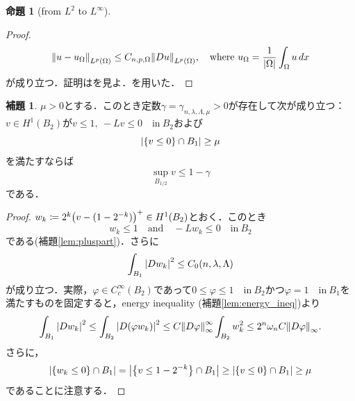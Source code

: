 \documentclass[a4paper]{ltjsarticle}
\newcommand{\Om}{\Omega}
\newcommand{\inn}{\quad\text{in}\ }
\newcommand{\1}{\mathbbm{1}}
\numberwithin{equation}{section}
\theoremstyle{definition}
\newtheorem{prop}[thm]{命題}
\newtheorem{lem}[thm]{補題}
\begin{document}
\begin{prop}[from $L^2$ to $L^\infty$]
\begin{proof}
{\begin{equation}
        \norm{u-u_{\Om}}_{L^p(\Om)}\leq C_{n,p,\Om}\norm{Du}_{L^p(\Om)},\quad \text{where }u_{\Om}=\frac{1}{\abs{\Om}}\int_{\Om}u\,dx 
    \end{equation}
    が成り立つ．証明は\cite[Section 5.8.1]{eva}を見よ．}を用いた．
\end{proof}
\begin{lem}\label{lem:DG_N_oscillation}
    $\mu>0$とする．このとき定数$\gamma=\gamma_{n,\lambda,\Lambda,\mu}>0$が存在して次が成り立つ：$v\in H^1(B_2)$が$v\leq 1,\ -Lv\leq0\inn B_2$および
    \begin{equation}
        \abs{\qty{v\leq0}\cap B_1}\geq \mu
    \end{equation}
    を満たすならば
    \begin{equation}
        \sup_{B_{1/2}}v\leq 1-\gamma 
    \end{equation}
    である．
\end{lem}
\begin{proof}
    $w_k\coloneqq 2^k\qty(v-(1-2^{-k}))^+\in H^{1}(B_2)$とおく．このとき
    \begin{equation}
        w_k\leq 1\quad \text{and}\quad -Lw_k\leq0\inn B_2 
    \end{equation}
    である(補題\ref{lem:pluspart})．さらに
    \begin{equation}
        \int_{B_1}\abs{Dw_k}^2\leq C_0(n,\lambda,\Lambda)
    \end{equation}
    が成り立つ．実際，$\varphi\in C^{\infty}_{c}(B_2)$であって$0\leq\varphi\leq 1\inn B_2$かつ$\varphi=1\inn B_1$を満たすものを固定すると，energy inequality (補題\ref{lem:energy_ineq})より
    \begin{equation}
        \int_{B_1}\abs{Dw_{k}}^2\leq \int_{B_2}\abs{D(\varphi w_k)}^2\leq C \norm{D\varphi}_{\infty}^{\infty}\int_{B_2}w_k^2\leq 2^n\omega_nC\norm{D\varphi}_{\infty}.
    \end{equation}
    さらに，
    \begin{equation}
        \abs{\qty{w_k\leq0}\cap B_1}=\abs{\qty{v\leq 1-2^{-k}}\cap B_1}\geq \abs{\qty{v\leq 0}\cap B_1}\geq\mu 
    \end{equation}
    であることに注意する．


\end{proof}
\end{prop}
\end{document}
